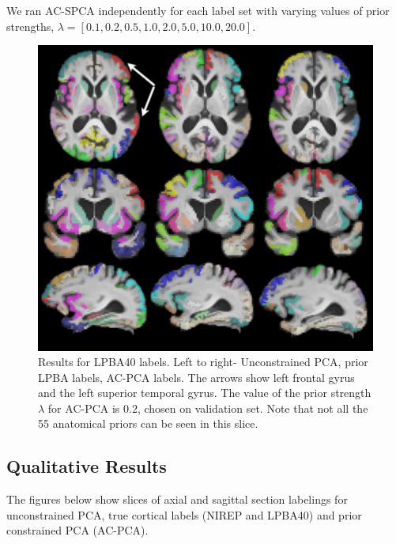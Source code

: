 \documentclass{llncs}
\begin{document}
\iffalse
We ran AC-SPCA independently for each label set with varying values of prior strengths, $\lambda =[0.1,0.2,0.5,1.0,2.0,5.0,10.0,20.0]$.


\begin{figure}
\begin{center}
\includegraphics[width=0.7\linewidth]{lpba.pdf} 
\end{center}
\vspace{-0.2in}
\caption{Results for LPBA40 labels. Left to right- Unconstrained PCA, prior LPBA labels, AC-PCA labels. The arrows show left frontal gyrus and the left superior temporal gyrus. The value of the prior strength $\lambda$ for AC-PCA is $0.2$, chosen on validation set. Note that not all the 55 anatomical priors can be seen in this slice.}
\label{fig:priorlpba}
\end{figure}


\subsection{Qualitative Results}

The figures below show slices of axial and sagittal section labelings for unconstrained PCA, true cortical labels (NIREP and LPBA40) and prior constrained PCA (AC-PCA).

\end{document}
